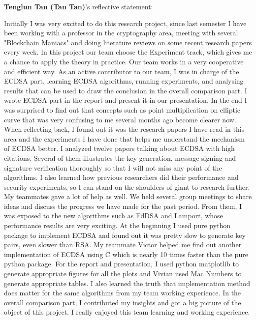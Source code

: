 \documentclass[10pt,sigconf]{acmart}
\begin{document}
\vspace{1em}

\noindent \textbf{Tenglun Tan (Tan Tan)}'s reflective statement:

Initially I was very excited to do this research project, since last semester I have been working with a professor in the cryptography area, meeting with several "Blockchain Maniacs" and doing literature reviews on some recent research papers every week. In this project our team choose the Experiment track, which gives me a chance to apply the theory in practice. Our team works in a very cooperative and efficient way. As an active contributor to our team, I was in charge of the ECDSA part, learning ECDSA algorithms, running experiments, and analysing results that can be used to draw the conclusion in the overall comparison part. I wrote ECDSA part in the report and present it in our presentation. In the end I was surprised to find out that concepts such as point multiplication on elliptic curve that was very confusing to me several months ago become clearer now. When reflecting back, I found out it was the research papers I have read in this area and the experiments I have done that helps me understand the mechanism of ECDSA better. I analyzed twelve papers talking about ECDSA with high citations. Several of them illustrates the key generation, message signing and signature verification thoroughly so that I will not miss any point of the algorithms. I also learned how previous researchers did their performance and security experiments, so I can stand on the shoulders of giant to research further. My teammates gave a lot of help as well. We held several group meetings to share ideas and discuss the progress we have made for the past period. From them, I was exposed to the new algorithms such as EdDSA and Lamport, whose performance results are very exciting. At the beginning I used pure python package to implement ECDSA and found out it was pretty slow to generate key pairs, even slower than RSA. My teammate Victor helped me find out another implementation of ECDSA using C which is nearly 10 times faster than the pure python package. For the report and presentation, I used python matplotlib  to generate appropriate figures for all the plots and Vivian used Mac Numbers to generate appropriate tables. I also learned the truth that implementation method does matter for the same algorithms from my team working experience. In the overall comparison part, I contributed my insights and got a big picture of the object of this project. I really enjoyed this team learning and working experience.
\end{document}

